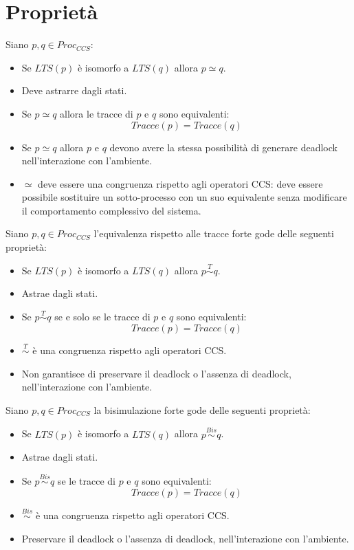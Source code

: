 \section{Proprietà}
Siano $p, q \in Proc_{CCS}$:
\begin{itemize}
    \item Se $LTS(p)$ è isomorfo a $LTS(q)$ allora $p \simeq q$.
    \item Deve astrarre dagli stati.
    \item Se $p \simeq q$ allora le tracce di $p$ e $q$ sono equivalenti:
          $$Tracce(p) = Tracce(q)$$
    \item Se $p \simeq q$ allora $p$ e $q$ devono avere la stessa possibilità di
          generare deadlock nell'interazione con l'ambiente.
    \item $\simeq$ deve essere una congruenza rispetto agli operatori CCS: deve
          essere possibile sostituire un sotto-processo con un suo equivalente senza
          modificare il comportamento complessivo del sistema.
\end{itemize}
Siano $p, q \in Proc_{CCS}$ l'equivalenza rispetto alle tracce forte gode delle
seguenti proprietà:
\begin{itemize}
    \item Se $LTS(p)$ è isomorfo a $LTS(q)$ allora $p \stackrel{T}{\sim} q$.
    \item Astrae dagli stati.
    \item Se $p \stackrel{T}{\sim} q$ se e solo se le tracce di $p$ e $q$ sono
          equivalenti: $$Tracce(p) = Tracce(q)$$
    \item $\stackrel{T}{\sim}$ è una congruenza rispetto agli operatori CCS.
    \item Non garantisce di preservare il deadlock o l'assenza di deadlock,
          nell'interazione con l'ambiente.
\end{itemize}
Siano $p, q \in Proc_{CCS}$ la bisimulazione forte gode delle seguenti proprietà:
\begin{itemize}
    \item Se $LTS(p)$ è isomorfo a $LTS(q)$ allora $p \stackrel{Bis}{\sim} q$.
    \item Astrae dagli stati.
    \item Se $p \stackrel{Bis}{\sim} q$ se le tracce di $p$ e $q$ sono equivalenti:
          $$Tracce(p) = Tracce(q)$$
    \item $\stackrel{Bis}{\sim}$ è una congruenza rispetto agli operatori CCS.
    \item Preservare il deadlock o l'assenza di deadlock, nell'interazione con
          l'ambiente.
\end{itemize}
